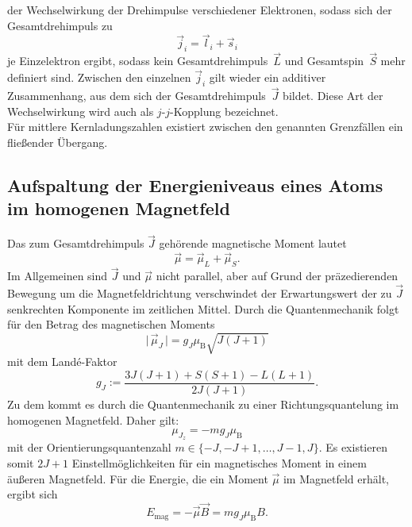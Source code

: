 der Wechselwirkung der Drehimpulse verschiedener Elektronen, sodass sich der Gesamtdrehimpuls zu
\begin{equation}
    \vec{j}_i=\vec{l}_i+\vec{s}_i
\end{equation}
je Einzelektron ergibt, sodass kein Gesamtdrehimpuls~$\vec{L}$ und Gesamtspin~$\vec{S}$ mehr definiert sind.
Zwischen den einzelnen $\vec{j}_i$ gilt wieder ein additiver Zusammenhang, aus dem sich der
Gesamtdrehimpuls~$\vec{J}$ bildet.
Diese Art der Wechselwirkung wird auch als $j$-$j$-Kopplung bezeichnet.\\
\newline
Für mittlere Kernladungszahlen existiert zwischen den genannten Grenzfällen ein fließender Übergang.

\subsection{Aufspaltung der Energieniveaus eines Atoms im homogenen Magnetfeld}
Das zum Gesamtdrehimpuls $\vec{J}$ gehörende magnetische Moment lautet
\begin{equation}
    \vec{\mu}=\vec{\mu}_L+\vec{\mu}_S.
\end{equation}
Im Allgemeinen sind $\vec{J}$ und $\vec{\mu}$ nicht parallel, aber auf Grund der präzedierenden
Bewegung um die Magnetfeldrichtung verschwindet der Erwartungswert der zu $\vec{J}$
senkrechten Komponente im zeitlichen Mittel.
Durch die Quantenmechanik folgt für den Betrag des magnetischen Moments
\begin{equation}
     \lvert\,\vec{\mu}_J\,\rvert=g_J\mu_{\mathup{B}}\sqrt{J(J+1)}
\end{equation}
mit dem Landé-Faktor
\begin{equation}
    g_J:=\frac{3J(J+1)+S(S+1)-L(L+1)}{2J(J+1)}.
    \label{eq:g_J}
\end{equation}
Zu dem kommt es durch die Quantenmechanik zu einer Richtungsquantelung im homogenen
Magnetfeld. Daher gilt:
\begin{equation}
    \mu_{J_z}=-mg_J\mu_{\mathup{B}}
\end{equation}
mit der Orientierungsquantenzahl $m\in\{-J,-J+1,\ldots,J-1,J\}$.
Es existieren somit $2J+1$ Einstellmöglichkeiten für ein magnetisches Moment in einem äußeren
Magnetfeld.
Für die Energie, die ein Moment $\vec{\mu}$ im Magnetfeld erhält, ergibt sich
\begin{equation}
    E_{\mathup{mag}}=-\vec{\mu}\vec{B}=mg_J\mu_{\mathup{B}}B.
    \label{eq:E_mag}
\end{equation}
